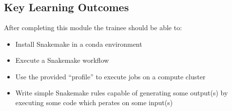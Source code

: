 
\chapter{\moduleTitle}
\newpage


% 
\section{Key Learning Outcomes}

After completing this module the trainee should be able to:
\begin{itemize}
  \item Install Snakemake in a conda environment
  \item Execute a Snakemake workflow
  \item Use the provided ``profile'' to execute jobs on a compute cluster
  \item Write simple Snakemake rules capable of generating some output(s) by executing some code which perates on some input(s)
\end{itemize}

